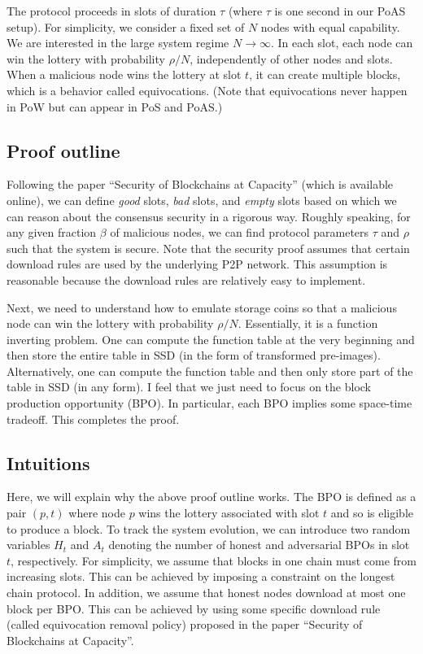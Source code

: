 \documentclass[12pt,draftcls,onecolumn]{IEEEtran}
\begin{document}

The protocol proceeds in slots of duration $\tau$ (where $\tau$ is one second in our PoAS setup). For simplicity, we consider a fixed set of $N$ nodes with equal capability. We
are interested in the large system regime $N \to \infty$. In each slot, each node can win the lottery with probability $\rho / N$,
independently of other nodes and slots. When a malicious node wins the lottery at slot $t$, it can create multiple blocks, which is a behavior called equivocations. (Note that equivocations never happen in PoW but can appear in PoS and PoAS.)




\subsection{Proof outline}


Following the paper ``Security of Blockchains at Capacity'' (which is available online),  we can define \emph{good} slots, \emph{bad} slots, and \emph{empty} slots based on which we can reason about the consensus security in a rigorous way. Roughly speaking, for any given fraction $\beta$ of malicious nodes, we can find protocol parameters $\tau$  and $\rho$ such that the system is secure. 
Note that the security proof assumes that certain download rules are used by the underlying P2P network. This assumption is reasonable because the download rules are relatively easy to implement.

Next, we need to understand how to emulate storage coins so that a malicious node can win the lottery with probability $\rho / N$.
Essentially, it is a function inverting problem. One can compute the function table at the very beginning and then store the entire table in SSD (in the form of transformed pre-images). Alternatively, one can compute the function table and then only store part of the table in SSD (in any form).
I feel that we just need to focus on the block production opportunity (BPO). In particular, each BPO implies some space-time tradeoff. This completes the proof.

\subsection{Intuitions}
Here, we will explain why the above proof outline works. The BPO is defined as a pair $(p, t)$ where node $p$ wins the lottery associated with slot $t$ and so is eligible to produce a block. To track the system evolution, we can introduce two random variables $H_t$ and $A_t$ denoting the number of honest and adversarial BPOs in slot $t$, respectively. For simplicity, we assume that blocks in one chain must come from increasing slots. This can be achieved by imposing a constraint on the longest chain protocol. In addition, we assume that honest nodes download at most one block per BPO. This can be achieved by using some specific download rule (called equivocation removal policy) proposed in the paper ``Security of Blockchains at Capacity''.
\end{document}
